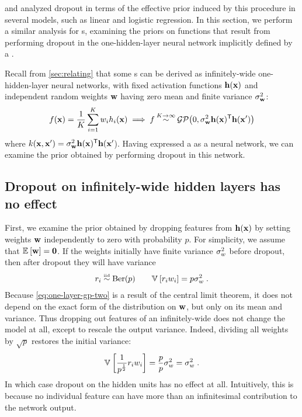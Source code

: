 \citet{baldi2013understanding} and \citet{wang2013fast} analyzed dropout in terms of the effective prior induced by this procedure in several models, such as linear and logistic regression.
In this section, we perform a similar analysis for \gp{}s, examining the priors on functions that result from performing dropout in the one-hidden-layer neural network implicitly defined by a \gp{}.

Recall from \cref{sec:relating} that some \gp{}s can be derived as infinitely-wide one-hidden-layer neural networks, with fixed activation functions ${\bf{h}}({\bf{x}})$ and independent random weights ${\bf{w}}$ having zero mean and finite variance $\sigma^2_{{\bf{w}}}$:
%
\begin{align}
f({\bf{x}}) 
= \frac{1}{K} \sum_{i=1}^K w_i h_i({\bf{x}})
\implies f \mathbin{\overset{K \to \infty}{\sim}} \mathcal{GP}\!\left(0,\sigma^2_{{\bf{w}}} {\bf{h}}({\bf{x}})^{\mathsf{T}}{\bf{h}}({\bf{x}}')\right)
\label{eq:one-layer-gp-two}
\end{align}
%
where $k({\bf{x}}, {\bf{x}}') = \sigma^2_{{\bf{w}}} {\bf{h}}({\bf{x}})^{\mathsf{T}}{\bf{h}}({\bf{x}}'$).
Having expressed a \gp{} as a neural network, we can examine the prior obtained by performing dropout in this network.



\subsection{Dropout on infinitely-wide hidden layers has no effect}

First, we examine the prior obtained by dropping features from ${\bf{h}}({\bf{x}})$ by setting weights ${\bf{w}}$ independently to zero with probability $p$.
For simplicity, we assume that $\mathbb{E}_{} \left[ {{\bf{w}}} \right] = {\bf{0}}$.
If the weights initially have finite variance $\sigma^2_{w}$ before dropout, then after dropout they will have variance
%
\begin{align}
r_i \overset{\mbox{\tiny iid}}{\sim} \textnormal{Ber}(p) \qquad
\mathbb{V}_{} \left[ {r_i w_i} \right] = p \sigma_{w}^2 \;.
\end{align}
%
Because \cref{eq:one-layer-gp-two} is a result of the central limit theorem, it does not depend on the exact form of the distribution on ${\bf{w}}$, but only on its mean and variance.
Thus dropping out features of an infinitely-wide \MLP{} does not change the model at all, except to rescale the output variance.
Indeed, dividing all weights by $\sqrt p$ restores the initial variance:
%
\begin{align}
\mathbb{V}_{} \left[ { \frac{1}{p^\frac{1}{2}} r_i w_i} \right] = \frac{p}{p} \sigma_{w}^2 = \sigma_{w}^2 \; .
\end{align}
%
In which case dropout on the hidden units has no effect at all.
Intuitively, this is because no individual feature can have more than an infinitesimal contribution to the network output.

